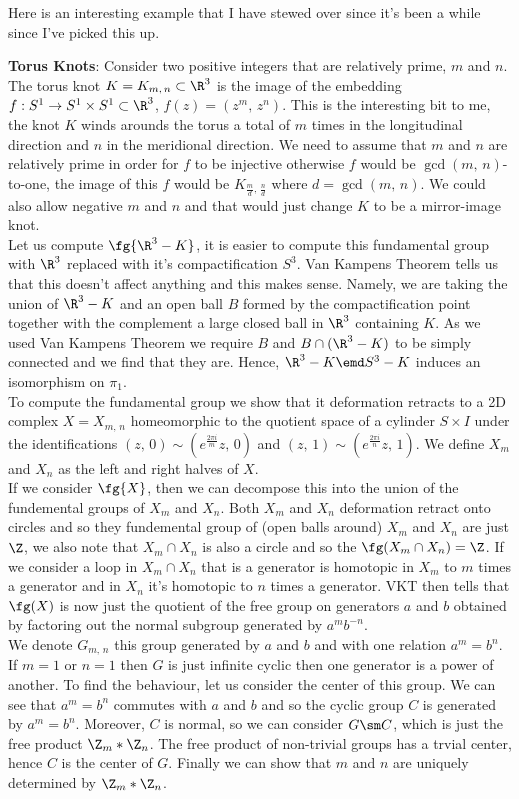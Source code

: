 Here is an interesting example that I have stewed over since it's been a while since I've picked this up.
\begin{eg}
  \textbf{Torus Knots}: Consider two positive integers that are relatively prime, $m$ and $n$. The torus knot $K = K_{m,\,n} \subset \R^3$ is the image of the embedding $f : S^1 \to S^1 \times S^1 \subset \R^3$, $f(z) = (z^m,\,z^n)$. This is the interesting bit to me, the knot $K$ winds arounds the torus a total of $m$ times in the longitudinal direction and $n$ in the meridional direction. We need to assume that $m$ and $n$ are relatively prime in order for $f$ to be injective otherwise $f$ would be $\gcd(m,\,n)$-to-one, the image of this $f$ would be $K_{\frac{m}{d},\,\frac{n}{d}}$ where $d = \gcd(m,\,n)$. We could also allow negative $m$ and $n$ and that would just change $K$ to be a mirror-image knot.\\
  Let us compute $\fg{\R^3 - K}$, it is easier to compute this fundamental group with $\R^3$ replaced with it's compactification $S^3$. Van Kampens Theorem tells us that this doesn't affect anything and this makes sense. Namely, we are taking the union of $\R^3 - K$ and an open ball $B$ formed by the compactification point together with the complement a large closed ball in $\R^3$ containing $K$. As we used Van Kampens Theorem we require $B$ and $B\cap (\R^3 - K)$ to be simply connected and we find that they are. Hence, $\R^3 - K \emd S^3 - K$ induces an isomorphism on $\pi_1$.\\
  To compute the fundamental group we show that it deformation retracts to a 2D complex $X = X_{m,\,n}$ homeomorphic to the quotient space of a cylinder $S \times I$ under the identifications $(z,\,0) \sim (e^{\frac{2\pi i}{m}}z,\,0)$ and $(z,\,1) \sim (e^{\frac{2\pi i}{n}}z,\,1)$. We define $X_m$ and $X_n$ as the left and right halves of $X$.\\
  If we consider $\fg{X}$, then we can decompose this into the union of the fundemental groups of $X_m$ and $X_n$. Both $X_m$ and $X_n$ deformation retract onto circles and so they fundemental group of (open balls around) $X_m$ and $X_n$ are just $\Z$, we also note that $X_m \cap X_n$ is also a circle and so the $\fg(X_m \cap X_n) = \Z$. If we consider a loop in $X_m \cap X_n$ that is a generator is homotopic in $X_m$ to $m$ times a generator and in $X_n$ it's homotopic to $n$ times a generator. VKT then tells that $\fg(X)$ is now just the quotient of the free group on generators $a$ and $b$ obtained by factoring out the normal subgroup generated by $a^mb^{-n}$. \\

  We denote $G_{m,\,n}$ this group generated by $a$ and $b$ and with one relation $a^m = b^n$. If $m = 1$ or $n = 1$ then $G$ is just infinite cyclic then one generator is a power of another. To find the behaviour, let us consider the center of this group. We can see that $a^m = b^n$ commutes with $a$ and $b$ and so the cyclic group $C$ is generated by $a^m = b^n$. Moreover, $C$ is normal, so we can consider $G \sm C$, which is just the free product $\Z_m * \Z_n$. The free product of non-trivial groups has a trvial center, hence $C$ is the center of $G$. Finally we can show that $m$ and $n$ are uniquely determined by $\Z_m * \Z_n$.
\end{eg}
